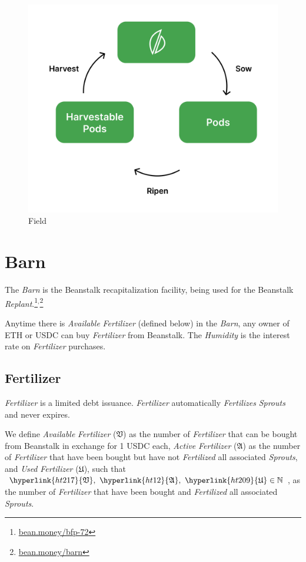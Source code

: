 \documentclass[tikz]{article}
\newcommand{\term}[1]{\textsl{#1}}
\begin{document}
\begin{figure}[h!]
    \centering
    \includegraphics[scale=.14]{Figure2}
    \vspace*{-5mm}
    \caption{Field}
    \label{fig 2}
\end{figure}

\newpage
\section{Barn}
The \term{Barn} is the Beanstalk recapitalization facility, being used for the Beanstalk \term{Replant}.\footnote{\href{https://bean.money/bfp-72}{bean.money/bfp-72}}$^{,}$\footnote{\href{https://bean.money/barn}{bean.money/barn}}

Anytime there is \term{Available} \term{Fertilizer} (defined below) in the \term{Barn}, any owner of ETH or USDC can buy \term{Fertilizer} from Beanstalk. The \term{Humidity} is the interest rate on \term{Fertilizer} purchases.

\subsection{Fertilizer}
\term{Fertilizer} is a limited debt issuance. \term{Fertilizer} automatically \term{Fertilizes} \term{Sprouts} and never expires.

We define \term{Available} \term{Fertilizer} (\hyperlink{ht217}{$\mathfrak{V}$}) as the number of \term{Fertilizer} that can be bought from Beanstalk in exchange for 1 USDC each, \term{Active} \term{Fertilizer} (\hyperlink{ht12}{$\mathfrak{A}$}) as the number of \term{Fertilizer} that have been bought but have not \term{Fertilized} all associated \term{Sprouts}, and \term{Used} \term{Fertilizer} (\hyperlink{ht209}{$\mathfrak{U}$}), such that $\hyperlink{ht217}{\mathfrak{V}},\ \hyperlink{ht12}{\mathfrak{A}},\ \hyperlink{ht209}{\mathfrak{U}} \in \mathbb{N}$, as the number of \term{Fertilizer} that have been bought and \term{Fertilized} all associated \term{Sprouts}. 
\end{document}
